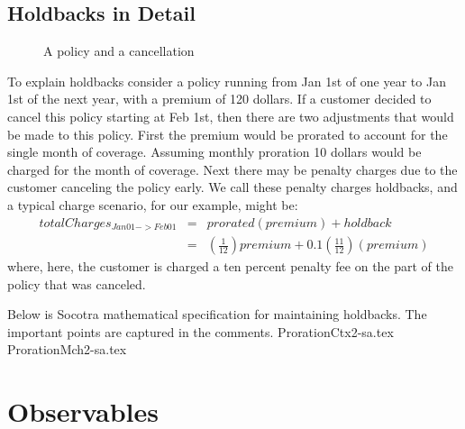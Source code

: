 \subsection{Holdbacks in Detail}

\begin{figure}[ht]
  \caption{
    A policy and a cancellation
  }
  \label{ch03:fig:3:2}
\end{figure}

To explain holdbacks consider a policy running from Jan 1st of one year to Jan 1st of the next year, with a
premium of 120 dollars. If
a customer decided to cancel this policy starting at Feb 1st, then there are two adjustments that would
be made to this policy. First the premium would be prorated to account for the single month of coverage.
Assuming monthly proration 10 dollars would be charged for the month of coverage. Next there may be penalty
charges due to the customer canceling the policy early. We call these penalty charges holdbacks, and a typical
charge scenario, for our example, might be:
\begin{eqnarray*}
totalCharges_{Jan01->Feb01} & = & prorated(premium) + holdback \\
                          & = & (\frac{1}{12}) premium + 0.1(\frac{11}{12})(premium)
\end{eqnarray*}
where, here, the customer is charged a ten percent penalty fee on the part of the policy that was canceled.


Below is Socotra mathematical specification for maintaining holdbacks. The important points are captured in
the comments.
{ProrationCtx2-sa.tex}
{ProrationMch2-sa.tex}

\section{Observables}
\label{sec:03:4}

